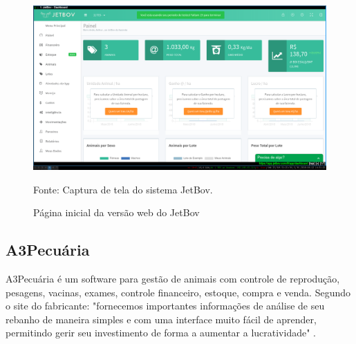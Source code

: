 \begin{figure}[H]
	\begin{center}
		\caption{Página inicial da versão web do JetBov}
		\includegraphics[width=\textwidth]{../img/jetbov.png}

		Fonte: Captura de tela do sistema JetBov.
	\end{center}
\end{figure}





\subsection{\textbf{A3Pecuária}}

A3Pecuária é um software para gestão de animais com controle de reprodução, pesagens, vacinas, exames, controle financeiro, estoque, compra e venda. Segundo o site do fabricante: "fornecemos importantes informações de análise de seu rebanho de maneira simples e com uma interface muito fácil de aprender, permitindo gerir seu investimento de forma a aumentar a lucratividade"  \cite{a3pecuaria16}.


